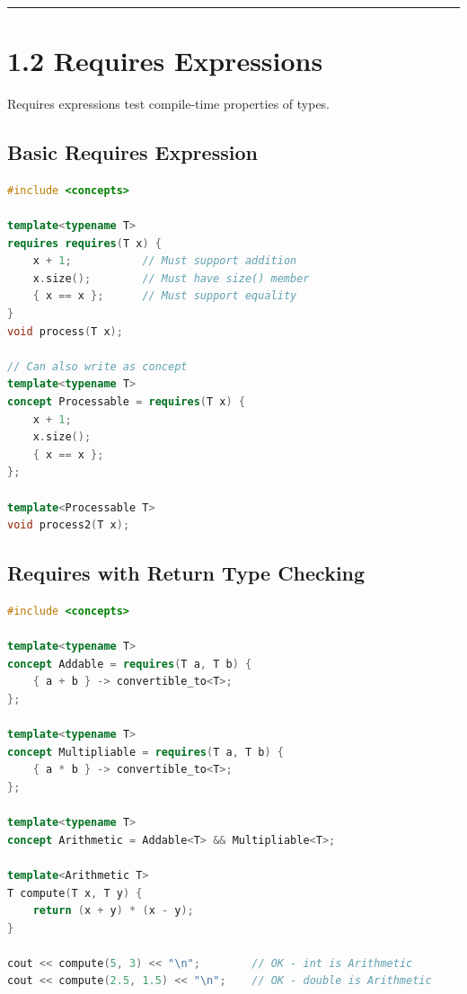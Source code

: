\begin{center}\rule{0.5\linewidth}{0.5pt}\end{center}

\hypertarget{requires-expressions}{%
\section{1.2 Requires Expressions}\label{requires-expressions}}

Requires expressions test compile-time properties of types.

\hypertarget{basic-requires-expression}{%
\subsection{Basic Requires Expression}\label{basic-requires-expression}}

\begin{lstlisting}[language={C++}]
#include <concepts>

template<typename T>
requires requires(T x) {
    x + 1;           // Must support addition
    x.size();        // Must have size() member
    { x == x };      // Must support equality
}
void process(T x);

// Can also write as concept
template<typename T>
concept Processable = requires(T x) {
    x + 1;
    x.size();
    { x == x };
};

template<Processable T>
void process2(T x);
\end{lstlisting}

\hypertarget{requires-with-return-type-checking}{%
\subsection{Requires with Return Type
Checking}\label{requires-with-return-type-checking}}

\begin{lstlisting}[language={C++}]
#include <concepts>

template<typename T>
concept Addable = requires(T a, T b) {
    { a + b } -> convertible_to<T>;
};

template<typename T>
concept Multipliable = requires(T a, T b) {
    { a * b } -> convertible_to<T>;
};

template<typename T>
concept Arithmetic = Addable<T> && Multipliable<T>;

template<Arithmetic T>
T compute(T x, T y) {
    return (x + y) * (x - y);
}

cout << compute(5, 3) << "\n";        // OK - int is Arithmetic
cout << compute(2.5, 1.5) << "\n";    // OK - double is Arithmetic
\end{lstlisting}

